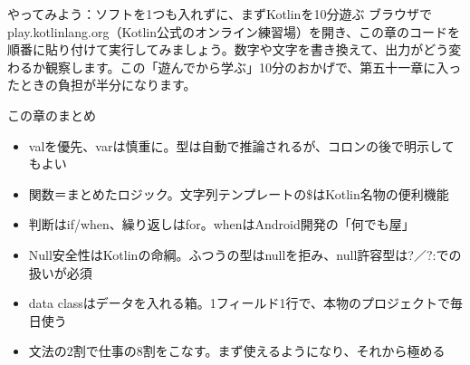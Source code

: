 \begin{tcbpractice}{やってみよう：ソフトを1つも入れずに、まずKotlinを10分遊ぶ}
ブラウザでplay.kotlinlang.org（Kotlin公式のオンライン練習場）を開き、この章のコードを順番に貼り付けて実行してみましょう。数字や文字を書き換えて、出力がどう変わるか観察します。この「遊んでから学ぶ」10分のおかげで、第五十一章に入ったときの負担が半分になります。

\end{tcbpractice}

\begin{tcbsummary}{この章のまとめ}
\begin{itemize}
  \item valを優先、varは慎重に。型は自動で推論されるが、コロンの後で明示してもよい
  \item 関数＝まとめたロジック。文字列テンプレートの\$はKotlin名物の便利機能
  \item 判断はif/when、繰り返しはfor。whenはAndroid開発の「何でも屋」
  \item Null安全性はKotlinの命綱。ふつうの型はnullを拒み、null許容型は?／?:での扱いが必須
  \item data classはデータを入れる箱。1フィールド1行で、本物のプロジェクトで毎日使う
  \item 文法の2割で仕事の8割をこなす。まず使えるようになり、それから極める
\end{itemize}

\end{tcbsummary}
